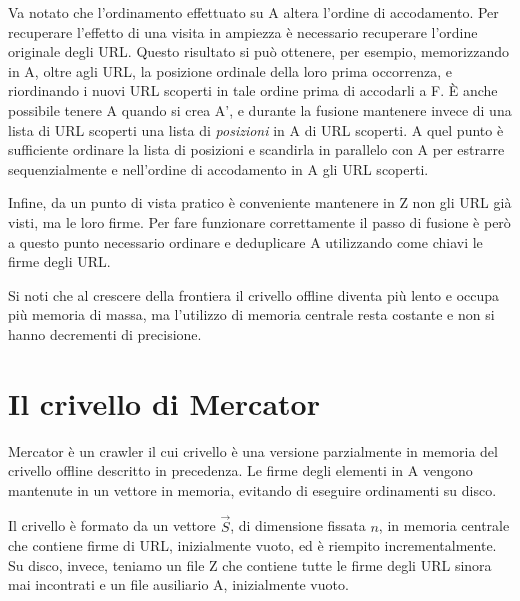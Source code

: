 Va notato che l'ordinamento effettuato su A altera l'ordine di accodamento. Per recuperare l'effetto di una visita in ampiezza è necessario recuperare l'ordine originale degli URL. Questo risultato si può ottenere, per esempio, memorizzando in A, oltre agli URL, la posizione ordinale della loro prima occorrenza, e riordinando i nuovi URL scoperti in tale ordine prima di accodarli a F. È anche possibile tenere A quando si crea A', e durante la fusione mantenere invece di una lista di URL scoperti una lista di \textit{posizioni} in A di URL scoperti. A quel punto è sufficiente ordinare la lista di posizioni e scandirla in parallelo con A per estrarre sequenzialmente e nell'ordine di accodamento in A gli URL scoperti.

Infine, da un punto di vista pratico è conveniente mantenere in Z non gli URL già visti, ma le loro firme. Per fare funzionare correttamente il passo di fusione è però a questo punto necessario ordinare e deduplicare A utilizzando come chiavi le firme degli URL.

Si noti che al crescere della frontiera il crivello offline diventa più lento e occupa più memoria di massa, ma l'utilizzo di memoria centrale resta costante e non si hanno decrementi di precisione.
\section{Il crivello di Mercator}
Mercator è un crawler \cite{Mercator} il cui crivello è una versione parzialmente in memoria del crivello offline descritto in precedenza. Le firme degli elementi in A vengono mantenute in un vettore in memoria, evitando di eseguire ordinamenti su disco.

Il crivello è formato da un vettore $\vec{S}$, di dimensione fissata $n$, in memoria centrale che contiene firme di URL, inizialmente vuoto, ed è riempito incrementalmente. Su disco, invece, teniamo un file Z che contiene tutte le firme degli URL sinora mai incontrati e un file ausiliario A, inizialmente vuoto.

